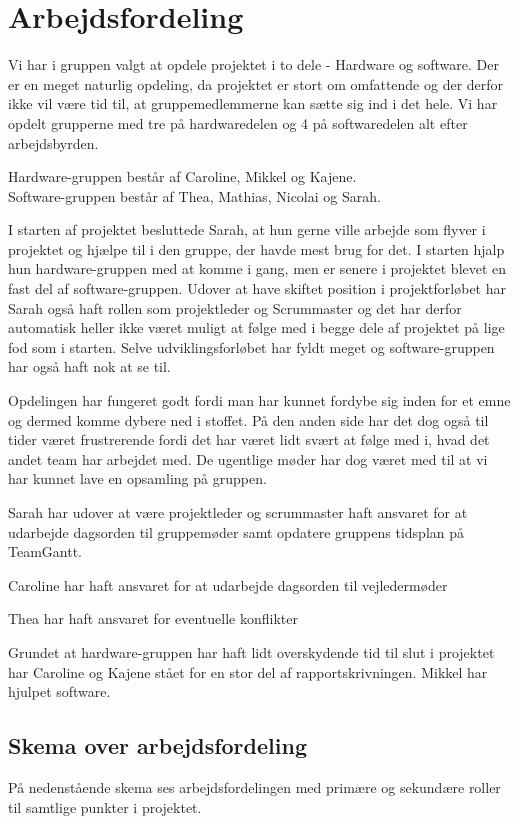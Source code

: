 \section{Arbejdsfordeling}
Vi har i gruppen valgt at opdele projektet i to dele - Hardware og software. Der er en meget naturlig opdeling, da projektet er stort om omfattende og der derfor ikke vil være tid til, at gruppemedlemmerne kan sætte sig ind i det hele. 
Vi har opdelt grupperne med tre på hardwaredelen og 4 på softwaredelen alt efter arbejdsbyrden. 

Hardware-gruppen består af Caroline, Mikkel og Kajene.\\
Software-gruppen består af Thea, Mathias, Nicolai og Sarah.

I starten af projektet besluttede Sarah, at hun gerne ville arbejde som flyver i projektet og hjælpe til i den gruppe, der havde mest brug for det. I starten hjalp hun hardware-gruppen med at komme i gang, men er senere i projektet blevet en fast del af software-gruppen. Udover at have skiftet position i projektforløbet har Sarah også haft rollen som projektleder og Scrummaster og det har derfor automatisk heller ikke været muligt at følge med i begge dele af projektet på lige fod som i starten. Selve udviklingsforløbet har fyldt meget og software-gruppen har også haft nok at se til.

Opdelingen har fungeret godt fordi man har kunnet fordybe sig inden for et emne og dermed komme dybere ned i stoffet. På den anden side har det dog også til tider været frustrerende fordi det har været lidt svært at følge med i, hvad det andet team har arbejdet med. De ugentlige møder har dog været med til at vi har kunnet lave en opsamling på gruppen. 

Sarah har udover at være projektleder og scrummaster haft ansvaret for at udarbejde dagsorden til gruppemøder samt opdatere gruppens tidsplan på TeamGantt.

Caroline har haft ansvaret for at udarbejde dagsorden til vejledermøder

Thea har haft ansvaret for eventuelle konflikter

Grundet at hardware-gruppen har haft lidt overskydende tid til slut i projektet har Caroline og Kajene stået for en stor del af rapportskrivningen. Mikkel har hjulpet software.
 
\subsection{Skema over arbejdsfordeling}
På nedenstående skema ses arbejdsfordelingen med primære og sekundære roller til samtlige punkter i projektet.

